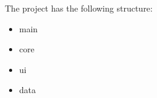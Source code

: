 The project has the following structure:
\begin{itemize}
    \item main
    \item core
    \item ui
    \item data
\end{itemize}